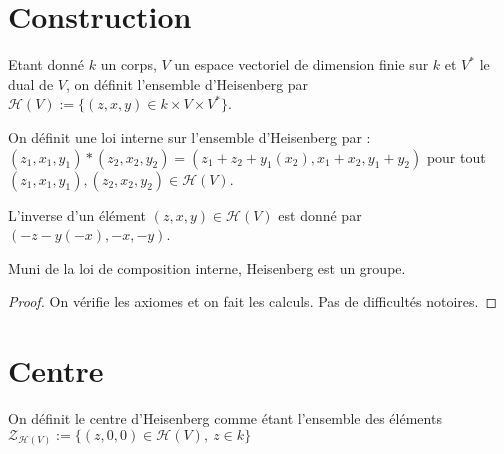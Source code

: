 \section{Construction}

\begin{definition}
    \label{def:heisenberg}
    \leanok

    Etant donné $k$ un corps, $V$ un espace vectoriel de dimension finie sur
    $k$ et $V^*$ le dual de $V$, on définit l'ensemble d'Heisenberg par 
    $\mathcal{H}(V):=\{(z,x,y) \in k\times V\times V^*\}$.
\end{definition}

\begin{definition}
    \label{def:mul_H}
    \leanok 

    On définit une loi interne sur l'ensemble d'Heisenberg par :
    $(z_1,x_1,y_1)*(z_2,x_2,y_2) = (z_1+z_2+y_1(x_2),x_1+x_2,y_1+y_2)$ pour
    tout $(z_1,x_1,y_1),(z_2,x_2,y_2)\in\mathcal{H}(V)$.
\end{definition}

\begin{definition}
    \label{def:inv_H}
    \leanok 

    L'inverse d'un élément $(z,x,y)\in\mathcal{H}(V)$ est donné par 
    $(-z- y(-x), - x ,- y)$.
\end{definition}

\begin{proposition}
    \label{prop:group_H}
    \leanok
    Muni de la loi de composition interne, Heisenberg est un groupe.
    \begin{proof}
        \leanok
        On vérifie les axiomes et on fait les calculs. Pas de difficultés
        notoires.
    \end{proof}
\end{proposition}

\section{Centre}

\begin{definition}
    \label{def:center_H}
    \leanok 

    On définit le centre d'Heisenberg comme étant l'ensemble des éléments
    $\mathcal{Z}_{\mathcal{H}(V)}:=\{(z,0,0)\in\mathcal{H}(V),\ z\in k\}$
\end{definition}

